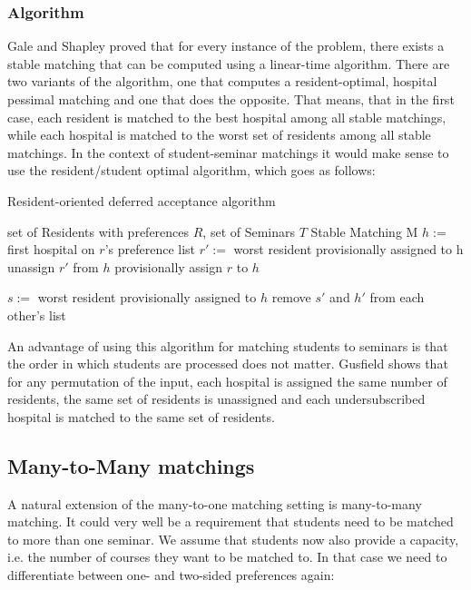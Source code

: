 \subsubsection{Algorithm}
Gale and Shapley \cite{GaleShapleyOrig} proved that for every instance of the problem, there exists a stable matching that can be computed using a linear-time algorithm. There are two variants of the algorithm, one that computes a resident-optimal, hospital pessimal matching and one that does the opposite. That means, that in the first case, each resident is matched to the best hospital among all stable matchings, while each hospital is matched to the worst set of residents among all stable matchings.\cite{Gusfield} In the context of student-seminar matchings it would make sense to use the resident/student optimal algorithm, which goes as follows\cite{Gusfield}:
\begin{algorithm} %
    \caption{Resident-oriented deferred acceptance algorithm} 
    \label{alg:resident-oriented-algorithm} 
    \begin{algorithmic} %
        \Require set of Residents with preferences $R$, set of Seminars $T$
        \Ensure Stable Matching M
        \State $h:=$ first hospital on $r$'s preference list
            \State $r':=$ worst resident provisionally assigned to h
            \State unassign $r'$ from $h$
        \EndIf
        \State provisionally assign $r$ to $h$

            $s:=$ worst resident provisionally assigned to $h$
                \State remove $s'$ and $h'$ from each other's list
            \EndFor
        \EndIf

        \EndWhile
    \end{algorithmic}
\end{algorithm}

An advantage of using this algorithm for matching students to seminars is that the order in which students are processed does not matter. Gusfield shows that for any permutation of the input, each hospital is assigned the same number of residents, the same set of residents is unassigned and each undersubscribed hospital is matched to the same set of residents.\cite{Gusfield}

\subsection{Many-to-Many matchings}
A natural extension of the many-to-one matching setting is many-to-many matching. It could very well be a requirement that students need to be matched to more than one seminar. We assume that students now also provide a capacity, i.e. the number of courses they want to be matched to. In that case we need to differentiate between one- and two-sided preferences again:

